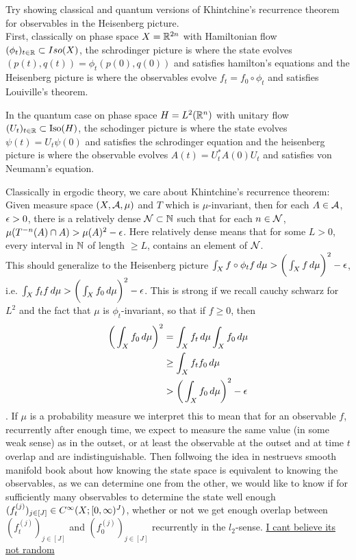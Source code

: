 \documentclass{book}
\begin{document}
	\begin{ex}
		Try showing classical and quantum versions of Khintchine's recurrence theorem for observables in the Heisenberg picture. \\
		
		First, classically on phase space $X = \mathbb{R}^{2n}$ with Hamiltonian flow $(\phi_t)_{t \in \mathbb{R}} \subset Iso(X)$, the schrodinger picture is where the state evolves $(p(t),q(t)) = \phi_t(p(0), q(0))$ and satisfies hamilton's equations and the Heisenberg picture is where the observables evolve $f_t = f_0 \circ \phi_t$ and satisfies Louiville's theorem.
		
		In the quantum case on phase space $H = L^2(\mathbb{R}^n)$ with unitary flow $(U_t)_{t \in \mathbb{R}} \subset \operatorname{Iso}(H)$, the schodinger picture is where the state evolves $\psi(t) = U_t \psi(0)$ and satisfies the schrodinger equation and the heisenberg picture is where the observable evolves $A(t) = U_t^*A(0)U_t$ and satisfies von Neumann's equation. 
		
		Classically in ergodic theory, we care about Khintchine's recurrence theorem: Given measure space $(X, \mathcal{A}, \mu)$ and $T$ which is $\mu$-invariant, then for each $A \in \mathcal{A}$, $\epsilon > 0$, there is a relatively dense $\mathcal{N} \subset \mathbb{N}$ such that for each $n \in \mathcal{N}$, $\mu(T^{-n}(A) \cap A) > \mu(A)^2 - \epsilon$. Here relatively dense means that for some $L > 0$, every interval in $\mathbb{N}$ of length $\geq L$, contains an element of $\mathcal{N}$. \\
		
		This should generalize to the Heisenberg picture $\int_X f \circ \phi_t f \, d \mu > \bigg( \int_X f \, d \mu \bigg)^2 - \epsilon$, i.e. $\int_X f_t f \, d \mu > \bigg( \int_X f_0 \, d \mu \bigg)^2 - \epsilon$. This is strong if we recall cauchy schwarz for $L^2$ and the fact that $\mu$ is $\phi_t$-invariant, so that if $f \geq 0$, then 
		\begin{align*}
			\bigg( \int_X f_0 \, d \mu \bigg)^2
			& = \int_X f_t \, d \mu \int_X f_0 \, d \mu \\
			& \geq \int_X f_t f_0 \, d \mu \\
			& > \bigg( \int_X f_0 \, d \mu \bigg)^2 - \epsilon
		\end{align*}
		. If $\mu$ is a probability measure we interpret this to mean that for an observable $f$, recurrently after enough time, we expect to measure the same value (in some weak sense) as in the outset, or at least the observable at the outset and at time $t$ overlap and are indistinguishable. Then follwoing the idea in nestruevs smooth manifold book about how knowing the state space is equivalent to knowing the observables, as we can determine one from the other, we would like to know if for sufficiently many observables to determine the state well enough $(f_t^{(j)})_{j \in [J]} \in C^{\infty}(X; [0,\infty)^J)$, whether or not we get enough overlap between $(f_t^{(j)})_{j \in [J]}$ and $(f_0^{(j)})_{j \in [J]}$ recurrently in the $l_2$-sense. \href{https://joelmoreira.wordpress.com/2012/04/15/recurrence-theorems/}{I cant believe its not random}\\
		

\end{ex}
\end{document}
